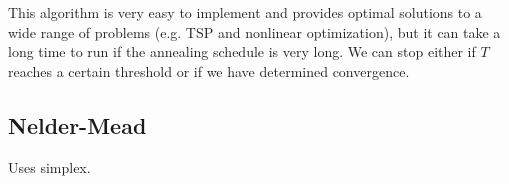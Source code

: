   This algorithm is very easy to implement and provides optimal solutions to a wide range of problems (e.g. TSP and nonlinear optimization), but it can take a long time to run if the annealing schedule is very long. We can stop either if $T$ reaches a certain threshold or if we have determined convergence. 

\subsection{Nelder-Mead} 

  Uses simplex. 
